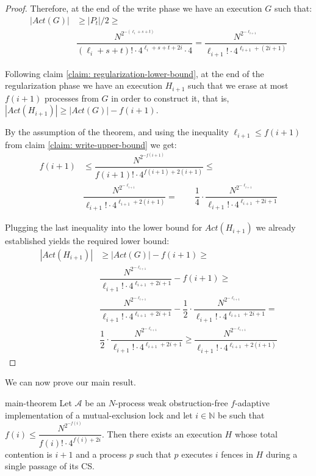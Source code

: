 \begin{proof}
	Therefore, at the end of the write phase we have an execution $G$ such that:
	\begin{align*}
	|Act(G)| &\geq |P_t|/2 \geq \\
	& \dfrac{N^{2^{-(\ell_i+s+t)}}}{(\ell_i+s+t)! \cdot 4^{\ell_i+s+t+2i} \cdot 4} =
	 \dfrac{N^{2^{-\ell_{i+1}}}}{\ell_{i+1}! \cdot 4^{\ell_{i+1}+(2i+1)}}
	\end{align*}
	
	
	Following claim \ref{claim: regularization-lower-bound}, at the end of the regularization phase we have an execution $H_{i+1}$ such that we erase at most $f(i+1)$ processes from $G$ in order to construct it, that is, $|Act(H_{i+1})| \geq |Act(G)|-f(i+1)$.
	
	By the assumption of the theorem, and using the inequality $\ell_{i+1} \leq f(i+1)$ from claim \ref{claim: write-upper-bound} we get:
	\begin{align*}
	f(i+1) &\leq \dfrac{N^{2^{-f(i+1)}}} {f(i+1)! \cdot 4^{f(i+1) + 2(i+1)}} \leq \\
	& \dfrac{N^{2^{-\ell_{i+1}}}} {\ell_{i+1}! \cdot 4^{\ell_{i+1} + 2(i+1)}} = \qquad \dfrac{1}{4} \cdot \dfrac{N^{2^{-\ell_{i+1}}}} {\ell_{i+1}! \cdot 4^{\ell_{i+1}+2i+1}}
	\end{align*}
	
	Plugging the last inequality into the lower bound for $Act(H_{i+1})$ we already established yields the required lower bound:
	\begin{align*}
		|Act(H_{i+1})| &\geq |Act(G)|-f(i+1) \geq \\
		& \dfrac{N^{2^{-\ell_{i+1}}}} {\ell_{i+1}! \cdot 4^{\ell_{i+1}+2i+1}}-f(i+1) \geq \\
		& \dfrac{N^{2^{-\ell_{i+1}}}} {\ell_{i+1}! \cdot 4^{\ell_{i+1}+2i+1}}-\dfrac{1}{2} \cdot \dfrac{N^{2^{-\ell_{i+1}}}} {\ell_{i+1}! \cdot 4^{\ell_{i+1}+2i+1}} = \\
		& \dfrac{1}{2} \cdot \dfrac{N^{2^{-\ell_{i+1}}}} {\ell_{i+1}! \cdot 4^{\ell_{i+1}+2i+1}} \geq
		\dfrac{N^{2^{-\ell_{i+1}}}} {\ell_{i+1}! \cdot 4^{\ell_{i+1}+2(i+1)}}
	\end{align*}
\end{proof}

We can now prove our main result.

\begin{theorem-repeat} {main-theorem}
	Let $\mathcal{A}$ be an $N$-process weak obstruction-free $f$-adaptive implementation of a mutual-exclusion lock and let $i \in \mathbb{N}$ be such that $f(i) \leq \dfrac{N^{2^{-f(i)}}} {f(i)! \cdot 4^{f(i)+2i}}$.
	Then there exists an execution $H$ whose total contention is $i+1$ and a process $p$ such that $p$ executes $i$ fences in $H$ during a single passage of its CS.\end{theorem-repeat}


